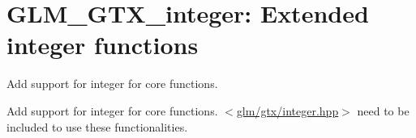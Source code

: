 \hypertarget{group__gtx__integer}{\section{\-G\-L\-M\-\_\-\-G\-T\-X\-\_\-integer\-: \-Extended integer functions}
\label{group__gtx__integer}
}


\-Add support for integer for core functions.  


\-Add support for integer for core functions. $<$\hyperlink{integer_8hpp}{glm/gtx/integer.\-hpp}$>$ need to be included to use these functionalities. 